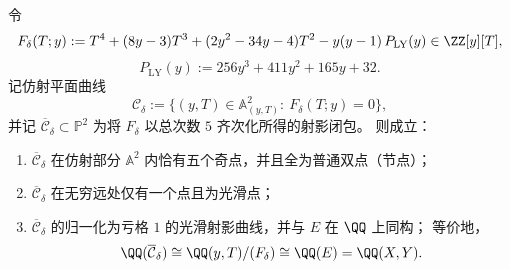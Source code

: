 \begin{theorem}\label{thm:xi-terminal-zm-delta-closure-plane-quintic}
令
\[
F_\delta(T;y):=T^{4}+(8y-3)T^{3}+(2y^{2}-34y-4)T^{2}-y(y-1)\,P_{\mathrm{LY}}(y)\in\ZZ[y][T],
\]
\[
P_{\mathrm{LY}}(y):=256y^{3}+411y^{2}+165y+32.
\]
记仿射平面曲线
\[
\mathcal C_\delta:=\{(y,T)\in\mathbb A^{2}_{(y,T)}:\ F_\delta(T;y)=0\},
\]
并记 \(\overline{\mathcal C}_\delta\subset\mathbb P^{2}\) 为将 \(F_\delta\) 以总次数 \(5\) 齐次化所得的射影闭包。
则成立：
\begin{enumerate}
  \item \(\overline{\mathcal C}_\delta\) 在仿射部分 \(\mathbb A^{2}\) 内恰有五个奇点，并且全为普通双点（节点）；
  \item \(\overline{\mathcal C}_\delta\) 在无穷远处仅有一个点且为光滑点；
  \item \(\overline{\mathcal C}_\delta\) 的归一化为亏格 \(1\) 的光滑射影曲线，并与 \(E\) 在 \(\QQ\) 上同构；
  等价地，
  \[
  \QQ(\overline{\mathcal C}_\delta)\cong \QQ(y,T)/(F_\delta)\cong \QQ(E)=\QQ(X,Y).
  \]
\end{enumerate}
\end{theorem}

